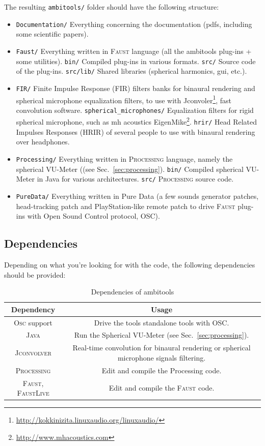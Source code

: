 \documentclass[10pt,a4paper]{article}
\begin{document}
The resulting \lstinline'ambitools/' folder should have the following structure:

\begin{itemize}
    \item \lstinline'Documentation/' Everything concerning the documentation (pdfs, including some scientific papers).
    \item \lstinline'Faust/' Everything written in \textsc{Faust} language (all the ambitools plug-ins + some utilities).
    	\subitem \lstinline'bin/' Compiled plug-ins in various formats.
    	\subitem \lstinline'src/' Source code of the plug-ins.
    	\subitem \lstinline'src/lib/' Shared libraries (spherical harmonics, gui, etc.).
    \item \lstinline'FIR/' Finite Impulse Response (FIR) filters banks for binaural rendering and spherical microphone equalization filters, to use with Jconvoler\footnote{\label{jconvolver}\url{http://kokkinizita.linuxaudio.org/linuxaudio/}}, fast convolution software.
    	\subitem \lstinline'spherical_microphones/' Equalization filters for rigid spherical microphone, such as mh acoustics EigenMike\textsuperscript{\textregistered}\footnote{\url{http://www.mhacoustics.com}}.
  		\subitem \lstinline'hrir/' Head Related Impulses Responses (HRIR) of several people to use with binaural rendering over headphones.
    \item \lstinline'Processing/' Everything written in \textsc{Processing} language, namely the spherical VU-Meter ((see Sec.~\ref{sec:processing}).
    	 \subitem \lstinline'bin/' Compiled spherical VU-Meter in Java for various architectures.
    	 \subitem \lstinline'src/' \textsc{Processing} source code.
    \item \lstinline'PureData/' Everything written in Pure Data (a few sounds generator patches, head-tracking patch and PlayStation-like remote patch to drive \textsc{Faust} plug-ins with Open Sound Control protocol, OSC).
\end{itemize}

\subsection{Dependencies}
Depending on what you're looking for with the code, the following dependencies should be provided:
\begin{table}[!ht]
\centering
\begin{tabular}{|c|c|}
\hline 
Dependency & Usage \\ 
\hline 
\textsc{Osc} support & Drive the tools standalone tools with OSC. \\
\hline
\textsc{Java} & Run the Spherical VU-Meter (see Sec.~\ref{sec:processing}). \\
\hline
\textsc{Jconvolver} & Real-time convolution for binaural rendering or spherical microphone signals filtering.\\
\hline
\textsc{Processing} & Edit and compile the Processing code. \\
\hline
\textsc{Faust}, \textsc{FaustLive}  & Edit and compile the \textsc{Faust} code.\\
\hline
\end{tabular}
\caption{Dependencies of ambitools}
\end{table}
\end{document}

